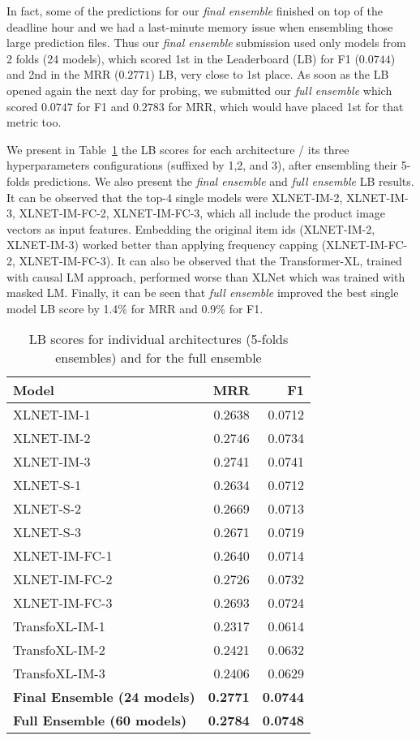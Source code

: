\documentclass[sigconf,screen]{acmart}
\begin{document}
In fact, some of the predictions for our \emph{final ensemble} finished on top of the deadline hour and we had a last-minute memory issue when ensembling those large prediction files. Thus our \emph{final ensemble} submission used only models from 2 folds (24 models), which scored 1st in the Leaderboard (LB) for F1 ($0.0744$) and 2nd in the MRR ($0.2771$) LB, very close to 1st place. As soon as the LB opened again the next day for probing, we submitted our \emph{full ensemble} which scored $0.0747$ for F1 and $0.2783$ for MRR, which would have placed 1st for that metric too. 

We present in Table~\ref{tab:model_resuls}  the LB scores for each architecture / its three hyperparameters configurations (suffixed by 1,2, and 3), after ensembling their 5-folds predictions. We also present the \emph{final ensemble} and \emph{full ensemble} LB results. It can be observed that the top-4 single models were XLNET-IM-2, XLNET-IM-3, XLNET-IM-FC-2, XLNET-IM-FC-3, which all include the product image vectors as input features. Embedding the original item ids (XLNET-IM-2, XLNET-IM-3) worked better than applying frequency capping (XLNET-IM-FC-2, XLNET-IM-FC-3). It can also be observed that the Transformer-XL, trained with causal LM approach, performed worse than XLNet which was trained with masked LM. Finally, it can be seen that \emph{full ensemble} improved the best single model LB score by 1.4\% for MRR and 0.9\% for F1.

\begin{table}[ht]
\caption{LB scores for individual architectures (5-folds ensembles) and for the full ensemble}
\footnotesize
\begin{tabular}{lrr}
Model & MRR & F1 \\ \hline
XLNET-IM-1     & 0.2638               & 0.0712 \\
XLNET-IM-2     & 0.2746               & 0.0734 \\
XLNET-IM-3     & 0.2741               & 0.0741 \\ \hline
XLNET-S-1      & 0.2634               & 0.0712 \\
XLNET-S-2      & 0.2669               & 0.0713 \\
XLNET-S-3      & 0.2671               & 0.0719  \\ \hline
XLNET-IM-FC-1  & 0.2640               & 0.0714   \\
XLNET-IM-FC-2  & 0.2726               & 0.0732   \\
XLNET-IM-FC-3  & 0.2693               & 0.0724  \\ \hline
TransfoXL-IM-1 & 0.2317 & 0.0614  \\
TransfoXL-IM-2 & 0.2421 & 0.0632  \\
TransfoXL-IM-3 & 0.2406 & 0.0629 \\ \hline
\textbf{Final Ensemble (24 models)}  & \textbf{0.2771}               & \textbf{0.0744} \\ 
\textbf{Full Ensemble (60 models)}  & \textbf{0.2784}               & \textbf{0.0748} \\ \hline
\end{tabular}
\label{tab:model_resuls}

\end{table}
\end{document}
